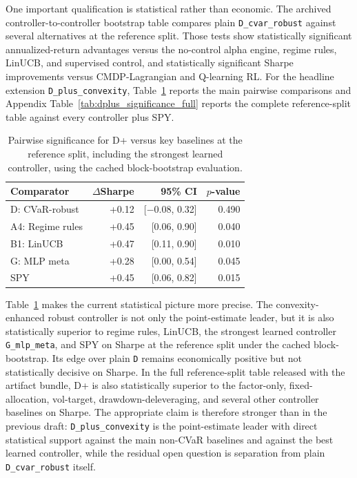 \documentclass[11pt]{article}
\begin{document}
One important qualification is statistical rather than economic. The archived
controller-to-controller bootstrap table compares plain
\texttt{D\_cvar\_robust} against several alternatives at the reference split.
Those tests show statistically significant annualized-return advantages versus
the no-control alpha engine, regime rules, LinUCB, and supervised control, and
statistically significant Sharpe improvements versus CMDP-Lagrangian and
Q-learning RL. For the headline extension \texttt{D\_plus\_convexity},
Table~\ref{tab:dplus_significance} reports the main pairwise comparisons and
Appendix Table~\ref{tab:dplus_significance_full} reports the complete
reference-split table against every controller plus SPY.

\begin{table}[t]
\centering
\small
\caption{Pairwise significance for D+ versus key baselines at the reference
split, including the strongest learned controller, using the cached
block-bootstrap evaluation.}
\label{tab:dplus_significance}
\begin{tabular}{@{} l r r r @{}}
\toprule
\textbf{Comparator} & \textbf{$\Delta$Sharpe} & \textbf{95\% CI} & \textbf{$p$-value} \\
\midrule
D: CVaR-robust & +0.12 & [$-$0.08, 0.32] & 0.490 \\
A4: Regime rules & +0.45 & [0.06, 0.90] & 0.040 \\
B1: LinUCB & +0.47 & [0.11, 0.90] & 0.010 \\
G: MLP meta & +0.28 & [0.00, 0.54] & 0.045 \\
SPY & +0.45 & [0.06, 0.82] & 0.015 \\
\bottomrule
\end{tabular}
\end{table}

Table~\ref{tab:dplus_significance} makes the current statistical picture more
precise. The convexity-enhanced robust controller is not only the
point-estimate leader, but it is also statistically superior to regime rules,
LinUCB, the strongest learned controller \texttt{G\_mlp\_meta}, and SPY on
Sharpe at the reference split under the cached block-bootstrap. Its edge over
plain \texttt{D} remains economically positive but not statistically decisive
on Sharpe. In the full reference-split table released with the artifact bundle,
D+ is also statistically superior to the factor-only, fixed-allocation,
vol-target, drawdown-deleveraging, and several other controller baselines on
Sharpe. The appropriate claim is therefore stronger than in the previous draft:
\texttt{D\_plus\_convexity} is the point-estimate leader with direct
statistical support against the main non-CVaR baselines and against the best
learned controller, while the residual open question is separation from plain
\texttt{D\_cvar\_robust} itself.
\end{document}
